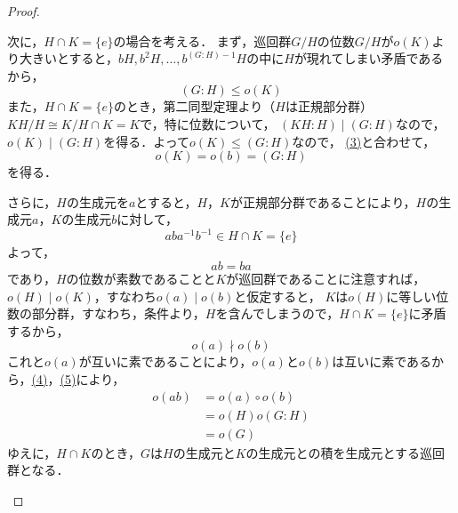 \documentclass[dvipdfmx,uplatex,11pt]{jsarticle}
\theoremstyle{mytheorem}
\begin{document}
\begin{leftbar}
\begin{proof}
\begin{enumerate}[(i)]
                    次に，$H \cap K=\{e\}$の場合を考える．
                    まず，巡回群$G /H$の位数$G /H$が$o(K)$より大きいとすると，$bH , b^2 H ,\ldots,b^{(G:H)-1}H$の中に$H$が現れてしまい矛盾であるから，
                    \begin{equation}
                        \label{eq:p80 17 1}
                        (G:H) \le o(K)
                    \end{equation}
                    また，$H \cap K=\{e\}$のとき，第二同型定理より（$H$は正規部分群）
                    $KH / H \cong K / H \cap K =K$で，特に位数について，
                    $(KH:H) \mid (G:H)$なので，$o(K) \mid (G:H)$を得る．よって$o(K) \le (G:H)$なので，
                    \hyperref[eq:p80 17 1]{(3)}と合わせて，
                    \begin{equation}
                        \label{eq:p80 17 2}
                        o(K)=o(b)=(G:H)
                    \end{equation}
                    を得る．

                    さらに，$H$の生成元を$a$とすると，$H$，$K$が正規部分群であることにより，$H$の生成元$a$，$K$の生成元$b$に対して，
                    \[
                        ab a^{-1}b^{-1} \in H \cap K =\{e\}
                    \]
                    よって，
                    \begin{equation}
                        \label{eq:p80 17 3}
                        ab = ba 
                    \end{equation}
                    であり，$H$の位数が素数であることと$K$が巡回群であることに注意すれば，$o (H) \mid o(K)$，すなわち$o(a) \mid o(b)$と仮定すると，
                    $K$は$o(H)$に等しい位数の部分群，すなわち，条件より，$H$を含んでしまうので，$H \cap K =\{e\}$に矛盾するから，
                    \[
                        o(a) \nmid o(b)
                    \]
                    これと$o(a)$が互いに素であることにより，$o(a)$と$o(b)$は互いに素であるから，\hyperref[eq:p80 17 2]{(4)}，\hyperref[eq:p80 17 3]{(5)}により，
                    \begin{align*}
                        o(ab)&=o(a) \circ o(b) \\
                        & = o(H)o(G:H) \\
                        & = o(G)
                    \end{align*}
                    ゆえに，$H \cap K$のとき，$G$は$H$の生成元と$K$の生成元との積を生成元とする巡回群となる．
                \end{enumerate}
            \end{proof}
        \end{leftbar}
\end{document}
